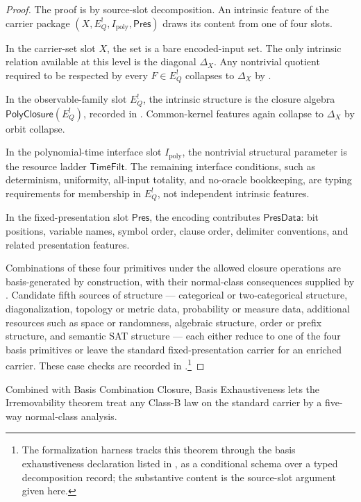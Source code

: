\documentclass[11pt]{article}
\newcommand{\Ipoly}{I_{\mathrm{poly}}}
\newcommand{\EQbang}{E^{!}_{Q}}
\theoremstyle{definition}
\begin{document}
\begin{proof}
The proof is by source-slot decomposition.  An intrinsic feature of
the carrier package \((X,\EQbang,\Ipoly,\mathsf{Pres})\) draws its
content from one of four slots.

In the carrier-set slot \(X\), the set is a bare encoded-input set.
The only intrinsic relation available at this level is the diagonal
\(\Delta_X\).  Any nontrivial quotient required to be respected by
every \(F\in\EQbang\) collapses to \(\Delta_X\) by
.

In the observable-family slot \(\EQbang\), the intrinsic structure is
the closure algebra \(\mathsf{PolyClosure}(\EQbang)\), recorded in
.  Common-kernel features again
collapse to \(\Delta_X\) by orbit collapse.

In the polynomial-time interface slot \(\Ipoly\), the nontrivial
structural parameter is the resource ladder \(\mathsf{TimeFilt}\).
The remaining interface conditions, such as determinism, uniformity,
all-input totality, and no-oracle bookkeeping, are typing requirements
for membership in \(\EQbang\), not independent intrinsic features.

In the fixed-presentation slot \(\mathsf{Pres}\), the encoding
contributes \(\mathsf{PresData}\): bit positions, variable names,
symbol order, clause order, delimiter conventions, and related
presentation features.

Combinations of these four primitives under the allowed closure
operations are basis-generated by construction, with their normal-class
consequences supplied by
.  Candidate fifth sources of
structure — categorical or two-categorical structure, diagonalization,
topology or metric data, probability or measure data, additional
resources such as space or randomness, algebraic structure, order or
prefix structure, and semantic SAT structure — each either reduce to
one of the four basis primitives or leave the standard
fixed-presentation carrier for an enriched carrier.  These case checks
are recorded in .\footnote{The
formalization harness tracks this theorem through the basis
exhaustiveness declaration listed in , as a
conditional schema over a typed decomposition record; the substantive
content is the source-slot argument given here.}
\end{proof}

Combined with Basis Combination Closure, Basis Exhaustiveness lets the
Irremovability theorem treat any Class-B law on the standard carrier by
a five-way normal-class analysis.
\end{document}
